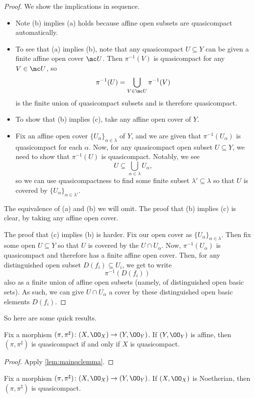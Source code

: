 \documentclass[../notes.tex]{subfiles}
\begin{document}
\begin{proof}
	We show the implications in sequence.
	\begin{itemize}
		\item Note (b) implies (a) holds because affine open subsets are quasicompact automatically.
		\item To see that (a) implies (b), note that any quasicompact $U\subseteq Y$ can be given a finite affine open cover $\mc U$. Then $\pi^{-1}(V)$ is quasicompact for any $V\in\mc U$, so
		\[\pi^{-1}(U)=\bigcup_{V\in\mc U}\pi^{-1}(V)\]
		is the finite union of quasicompact subsets and is therefore quasicompact.
		\item To show that (b) implies (c), take any affine open cover of $Y$.
		\item Fix an affine open cover $\{U_\alpha\}_{\alpha\in\lambda}$ of $Y$, and we are given that $\pi^{-1}(U_\alpha)$ is quasicompact for each $\alpha$. Now, for any quasicompact open subset $U\subseteq Y$, we need to show that $\pi^{-1}(U)$ is quasicompact. Notably, we see
		\[U\subseteq\bigcup_{\alpha\in\lambda}U_\alpha,\]
		so we can use quasicompactness to find some finite subset $\lambda'\subseteq\lambda$ so that $U$ is covered by $\{U_\alpha\}_{\alpha\in\lambda'}$.
	\end{itemize}
	The equivalence of (a) and (b) we will omit. The proof that (b) implies (c) is clear, by taking any affine open cover.

	The proof that (c) implies (b) is harder. Fix our open cover as $\{U_\alpha\}_{\alpha\in\lambda}$. Then fix some open $U\subseteq Y$ so that $U$ is covered by the $U\cap U_\alpha$. Now, $\pi^{-1}(U_\alpha)$ is quasicompact and therefore has a finite affine open cover. Then, for any distinguished open subset $D(f_i)\subseteq U_i$, we get to write
	\[\pi^{-1}(D(f_i))\]
	also as a finite union of affine open subsets (namely, of distinguished open basic sets). As such, we can give $U\cap U_\alpha$ a cover by these distinguished open basic elements $D(f_i)$.
\end{proof}
So here are some quick results.
\begin{cor}
	Fix a morphism $(\pi,\pi^\sharp)\colon(X,\OO_X)\to(Y,\OO_Y)$. If $(Y,\OO_Y)$ is affine, then $(\pi,\pi^\sharp)$ is quasicompact if and only if $X$ is quasicompact.
\end{cor}
\begin{proof}
	Apply \autoref{lem:mainqclemma}.
\end{proof}
\begin{corollary}
	Fix a morphism $(\pi,\pi^\sharp)\colon(X,\OO_X)\to(Y,\OO_Y)$. If $(X,\OO_X)$ is Noetherian, then $(\pi,\pi^\sharp)$ is quasicompact.
\end{corollary}
\end{document}
